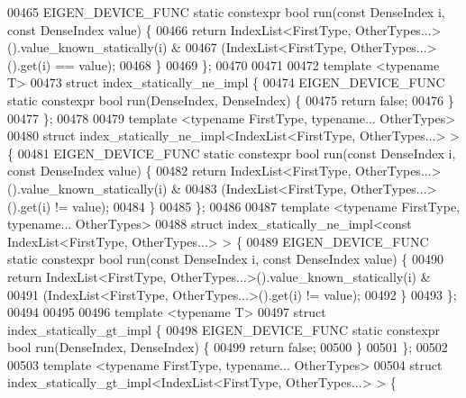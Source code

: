 \begin{DoxyCode}
00465   EIGEN\_DEVICE\_FUNC \textcolor{keyword}{static} constexpr \textcolor{keywordtype}{bool} run(\textcolor{keyword}{const} DenseIndex i, \textcolor{keyword}{const} DenseIndex value) \{
00466     \textcolor{keywordflow}{return} IndexList<FirstType, OtherTypes...>().value\_known\_statically(i) &
00467         (IndexList<FirstType, OtherTypes...>().\textcolor{keyword}{get}(i) == value);
00468   \}
00469 \};
00470 
00471 
00472 \textcolor{keyword}{template} <\textcolor{keyword}{typename} T>
00473 \textcolor{keyword}{struct }index\_statically\_ne\_impl \{
00474   EIGEN\_DEVICE\_FUNC \textcolor{keyword}{static} constexpr \textcolor{keywordtype}{bool} run(DenseIndex, DenseIndex) \{
00475     \textcolor{keywordflow}{return} \textcolor{keyword}{false};
00476   \}
00477 \};
00478 
00479 \textcolor{keyword}{template} <\textcolor{keyword}{typename} FirstType, \textcolor{keyword}{typename}... OtherTypes>
00480 \textcolor{keyword}{struct }index\_statically\_ne\_impl<IndexList<FirstType, OtherTypes...> > \{
00481   EIGEN\_DEVICE\_FUNC \textcolor{keyword}{static} constexpr \textcolor{keywordtype}{bool} run(\textcolor{keyword}{const} DenseIndex i, \textcolor{keyword}{const} DenseIndex value) \{
00482     \textcolor{keywordflow}{return} IndexList<FirstType, OtherTypes...>().value\_known\_statically(i) &
00483         (IndexList<FirstType, OtherTypes...>().\textcolor{keyword}{get}(i) != value);
00484   \}
00485 \};
00486 
00487 \textcolor{keyword}{template} <\textcolor{keyword}{typename} FirstType, \textcolor{keyword}{typename}... OtherTypes>
00488 \textcolor{keyword}{struct }index\_statically\_ne\_impl<const IndexList<FirstType, OtherTypes...> > \{
00489   EIGEN\_DEVICE\_FUNC \textcolor{keyword}{static} constexpr \textcolor{keywordtype}{bool} run(\textcolor{keyword}{const} DenseIndex i, \textcolor{keyword}{const} DenseIndex value) \{
00490     \textcolor{keywordflow}{return} IndexList<FirstType, OtherTypes...>().value\_known\_statically(i) &
00491         (IndexList<FirstType, OtherTypes...>().\textcolor{keyword}{get}(i) != value);
00492   \}
00493 \};
00494 
00495 
00496 \textcolor{keyword}{template} <\textcolor{keyword}{typename} T>
00497 \textcolor{keyword}{struct }index\_statically\_gt\_impl \{
00498   EIGEN\_DEVICE\_FUNC \textcolor{keyword}{static} constexpr \textcolor{keywordtype}{bool} run(DenseIndex, DenseIndex) \{
00499     \textcolor{keywordflow}{return} \textcolor{keyword}{false};
00500   \}
00501 \};
00502 
00503 \textcolor{keyword}{template} <\textcolor{keyword}{typename} FirstType, \textcolor{keyword}{typename}... OtherTypes>
00504 \textcolor{keyword}{struct }index\_statically\_gt\_impl<IndexList<FirstType, OtherTypes...> > \{

\end{DoxyCode}
